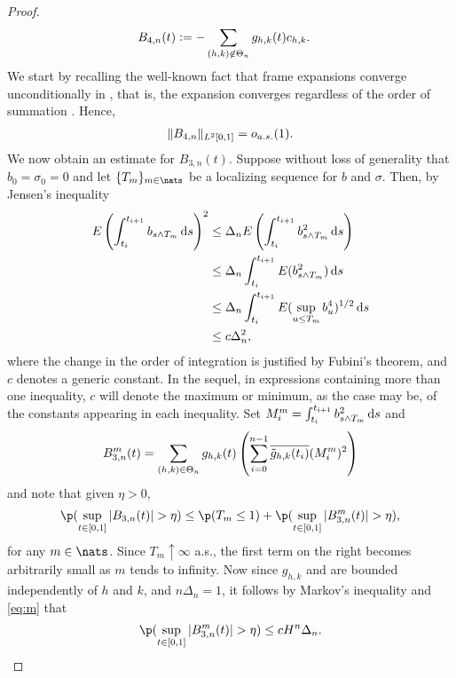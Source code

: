 \begin{proof}
\begin{align}
  &B_{4,n}(t) := - \sum_{\substack{(h,k) \not\in \Theta_n }}g_{h,k}(t){c}_{h,k}. 
  \label{}
\end{align}
We start by recalling the well-known fact that  frame expansions converge unconditionally in \Ltwo, that is, the expansion converges regardless of the order of summation \citep[Theorem 5.1.7]{Christensen2008}.  Hence,   
\begin{align}
  \Vert B_{4, n}  \Vert_{L^2[0,1]} = o_{a.s.}(1).\notag
  \label{}
\end{align}
We now obtain an estimate for  $B_{3,n}(t)$. Suppose without loss of generality that $b_0 = \sigma_0 =  0$ and let $\{T_m\}_{m \in \nats}$ be a localizing sequence for $b$ and $\sigma$.  Then, by Jensen's inequality
\begin{align}
 E\left(\int_{t_i}^{t_{i+1}} b_{s \wedge T_m}  \D s\right)^2  &\le \Delta_n E\left(\int_{t_i}^{t_{i+1}} b_{s \wedge T_m}^2  \D s\right) \notag \\
&\le \Delta_n \int_{t_i}^{t_{i+1}} E(b_{s \wedge T_m}^2)  \D s \notag\\
&\le \Delta_n \int_{t_i}^{t_{i+1}} E(\sup_{u \le T_m}b_{u}^4)^{1/2}  \D s \notag\\
& \le c \Delta_n^2,
  \label{eq:m}
\end{align}
where the change in the order of integration is justified by Fubini's theorem, and $c$ denotes  a generic constant. In  the sequel, in expressions containing more than one inequality, $c$ will denote the maximum or minimum, as the case may be, of the constants appearing in each inequality.      Set $M_i^m = \int_{t_i}^{t_{i+1}} b_{s \wedge T_m}^2  \D s$ and 
\begin{align}
  B^m_{3,n}(t) = \sum_{(h,k) \in \Theta_n} g_{h,k}(t)\left( \sum_{i=0}^{n-1} \overline{\tilde{g}_{h,k}(t_i)} (M_i^m)^2 \right)\notag
  \label{}
\end{align}
and note that given $\eta > 0$,
\begin{align}
 \p(\sup_{t \in \domain} \vert B_{3,n}(t)\vert >  \eta ) \le \p(T_m \le 1) + \p( \sup_{t \in \domain} \vert B_{3,n}^m(t)\vert > \eta), \notag
  \label{}
\end{align}
for any $m \in \nats$. Since $T_m \uparrow \infty$ a.s., the first term on the right becomes arbitrarily small as $m$ tends to infinity. Now since  $g_{h,k}$ and \tghk  are bounded independently of $h$ and $k$, and $n\Delta_n = 1$, it follows by Markov's inequality and \eqref{eq:m} that 
\begin{align}
  \p( \sup_{t \in \domain} \vert B_{3,n}^m(t)\vert > \eta) \le  c H^n \Delta_n.  \notag

\end{align}
\end{proof}
